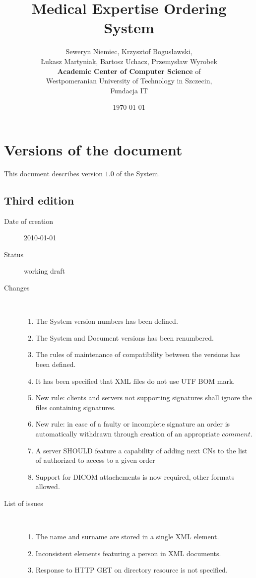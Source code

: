 \documentclass[a4paper]{article}
\begin{document}
\title{Medical Expertise Ordering System}
\author{Seweryn Niemiec, Krzysztof Bogusławski,\\ 
Łukasz Martyniak, Bartosz Uchacz, Przemysław Wyrobek \\ 
\textbf{Academic Center of Computer Science } of \\ 
Westpomeranian University of Technology in Szczecin,\\
Fundacja IT}
\date{\today}
\maketitle
\tableofcontents
\listoffigures
\listoftables

\section{Versions of the document}

This document describes version $1.0$ of the System.

\subsection{Third edition}
\begin{description}
  \item[Date of creation] 2010-01-01
  \item[Status] working draft
  \item[Changes] \hfill \\
	\begin{enumerate}
      \item The System version numbers has been defined.
      \item The System and Document versions has been renumbered.
      \item The rules of maintenance of compatibility between the versions has been defined.
	  \item It has been specified that XML files do not use UTF BOM mark.
      \item New rule: clients and servers not supporting signatures shall 
		ignore the files containing signatures.
      \item New rule: in case of a faulty or incomplete signature an order is 
		automatically withdrawn through creation of an appropriate $comment$.
      \item A server SHOULD feature a capability of adding next CNs to the 
		list of authorized to access to a given order
      \item Support for DICOM attachements is now required, other formats allowed.
	\end{enumerate}
  \item[List of issues] \hfill \\
	\begin{enumerate}
      \item The name and surname are stored in a single XML element.
      \item Inconsistent elements featuring a person in XML documents.
	  \item Response to HTTP GET on directory resource is not specified.
	\end{enumerate}
\end{description}
\end{document}
